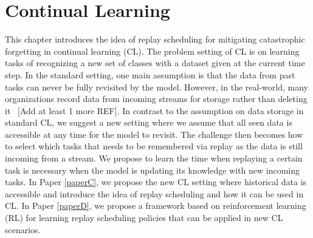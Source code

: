 
\chapter{Continual Learning}\label{chap4}


This chapter introduces the idea of replay scheduling for mitigating catastrophic forgetting in continual learning (CL). The problem setting of CL is on learning tasks of recognizing a new set of classes with a dataset given at the current time step. In the standard setting, one main assumption is that the data from past tasks can never be fully revisited by the model. However, in the real-world, many organizations record data from incoming streams for storage rather than deleting it~\cite{bailis2017macrobase, mitchell1999machinelearning} [Add at least 1 more REF]. In contrast to the assumption on data storage in standard CL, we suggest a new setting where we assume that all seen data is accessible at any time for the model to revisit. The challenge then becomes how to select which tasks that needs to be remembered via replay as the data is still incoming from a stream. We propose to learn the time when replaying a certain task is necessary when the model is updating its knowledge with new incoming tasks. In Paper \ref{paperC}, we propose the new CL setting where historical data is accessible and introduce the idea of replay scheduling and how it can be used in CL. In Paper \ref{paperD}, we propose a framework based on reinforcement learning~\cite{sutton2018reinforcement} (RL) for learning replay scheduling policies that can be applied in new CL scenarios. 




